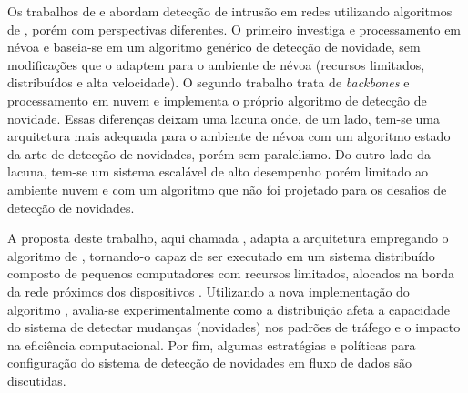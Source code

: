 Os trabalhos de  e  abordam
detecção de intrusão em redes utilizando algoritmos de \nd, porém com
perspectivas diferentes.
O primeiro investiga \iot e processamento em névoa e baseia-se em um algoritmo
genérico de detecção de novidade, sem modificações que o adaptem para o ambiente
de névoa (recursos limitados, distribuídos e alta velocidade).
O segundo trabalho trata de \emph{backbones} e processamento em nuvem e
implementa o próprio algoritmo de detecção de novidade.
Essas diferenças deixam uma lacuna onde, de um lado, tem-se uma
arquitetura mais adequada para o ambiente de névoa com um algoritmo estado da arte de
detecção de novidades, porém sem paralelismo.
Do outro lado da lacuna, tem-se um sistema escalável de alto desempenho porém
limitado ao ambiente nuvem e com um algoritmo que não foi projetado
para os desafios de detecção de novidades.


A proposta deste trabalho, aqui chamada \mfog, adapta a arquitetura \arch
\cite{Cassales2019} empregando o algoritmo de \nd \minas \cite{Faria2016minas},
tornando-o capaz de ser executado em um sistema distribuído composto de pequenos
computadores com recursos limitados, alocados na borda da rede próximos dos
dispositivos \iot.
Utilizando a nova implementação do algoritmo \minas, avalia-se experimentalmente
como a distribuição afeta a capacidade do sistema de detectar mudanças
(novidades) nos padrões de tráfego e o impacto na eficiência computacional.
Por fim, algumas estratégias e políticas para configuração do sistema de
detecção de novidades em fluxo de dados são discutidas.


